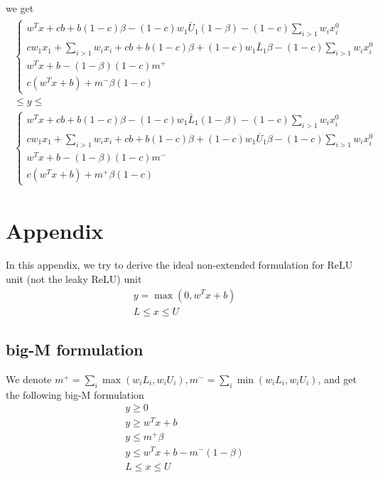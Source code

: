 \documentclass{article}
\begin{document}
we get
\begin{align}
	\begin{split}
	\begin{cases}
		w^Tx + cb + b(1-c)\beta - (1-c)w_1\bar{U}_1(1-\beta)-(1-c)\sum_{i>1}w_ix^0_i\\
		cw_1x_1 + \sum_{i>1}w_ix_i + cb + b(1-c)\beta + (1-c)w_1\bar{L}_1\beta - (1-c)\sum_{i>1}w_ix^0_i\\
		w^Tx+b - (1-\beta)(1-c)m^+\\
		c(w^Tx+b) + m^-\beta(1-c)
	\end{cases}\\
	\le y \le\\
	\begin{cases}
		w^Tx + cb + b(1-c)\beta - (1-c)w_1\bar{L}_1(1-\beta)-(1-c)\sum_{i>1}w_ix^0_i\\
		cw_1x_1 + \sum_{i>1}w_ix_i + cb + b(1-c)\beta + (1-c)w_1\bar{U}_1\beta - (1-c)\sum_{i>1}w_ix^0_i\\
		w^Tx+b - (1-\beta)(1-c)m^-\\
		c(w^Tx+b) + m^+\beta(1-c)
	\end{cases}
\end{split}
\end{align}


\section{Appendix}
In this appendix, we try to derive the ideal non-extended formulation for ReLU unit (not the leaky ReLU) unit 
\begin{subequations}
\begin{align}
	y = \max(0, w^Tx + b)\\
	L \le x \le U
\end{align}
\end{subequations}
\subsection{big-M formulation}
We denote $m^+ = \sum_i \max(w_iL_i, w_iU_i), m^- = \sum_i \min(w_iL_i, w_iU_i)$, and get the following big-M formulation
\begin{subequations}
\begin{align}
	y \ge 0\\
	y \ge w^Tx + b\\
	y \le m^+\beta\\
	y \le w^Tx+b - m^-(1-\beta)\\
	L \le x \le U
\end{align}
\end{subequations}
\end{document}
